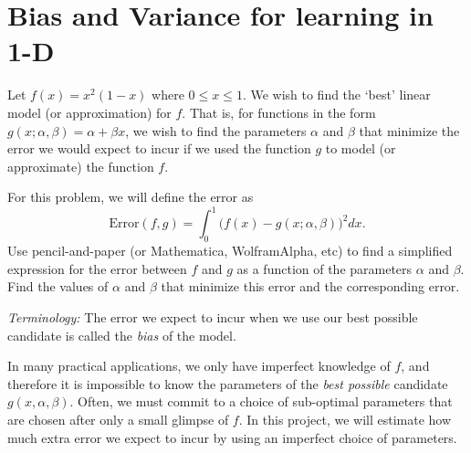 \section{Bias and Variance for learning in 1-D}

Let $f(x) = x^2(1-x)$ where $0 \leq x \leq 1$. We wish to find the `best' linear model (or approximation) for $f$. That is, for functions in the form $g(x; \alpha, \beta) =  \alpha +  \beta x$,  we wish to find the parameters $ \alpha$ and $ \beta$ that minimize the error we would expect to incur if we used the function $g$ to model (or approximate) the function $f$. 
\begin{center}
\end{center}
For this problem, we will define the error as
\begin{equation*}
\text{Error}(f,g) = \int_0^1 \bigg(f(x) - g(x; \alpha, \beta)\bigg)^2 dx.
\end{equation*} 
Use pencil-and-paper (or Mathematica, WolframAlpha, etc) to find a simplified expression for the error between $f$ and $g$ as a function of the parameters $ \alpha$ and $ \beta$. Find the values of $ \alpha$ and $ \beta$ that minimize this error and the corresponding error.

\noindent\textit{Terminology:} The error we expect to incur when we use our best possible candidate is called the \textit{bias} of the model.

In many practical applications, we only have imperfect knowledge of $f$, and therefore it is impossible to know the parameters of the \textit{best possible} candidate $g(x, \alpha, \beta)$. Often, we must commit to a choice of sub-optimal parameters that are chosen after only a small glimpse of $f$. In this project, we will estimate how much extra error we expect to incur by using an imperfect choice of parameters.


